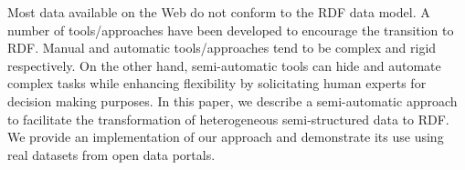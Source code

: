 Most data available on the Web do not conform to the RDF data model. A number of tools/approaches have been developed to encourage the transition to RDF. Manual and automatic tools/approaches tend to be complex and rigid respectively. On the other hand, semi-automatic tools can hide and automate complex tasks while enhancing flexibility by solicitating human experts for decision making purposes. In this paper, we describe a semi-automatic approach to facilitate the transformation of heterogeneous semi-structured data to RDF. We provide an implementation of our approach and demonstrate its use using real datasets from open data portals.




